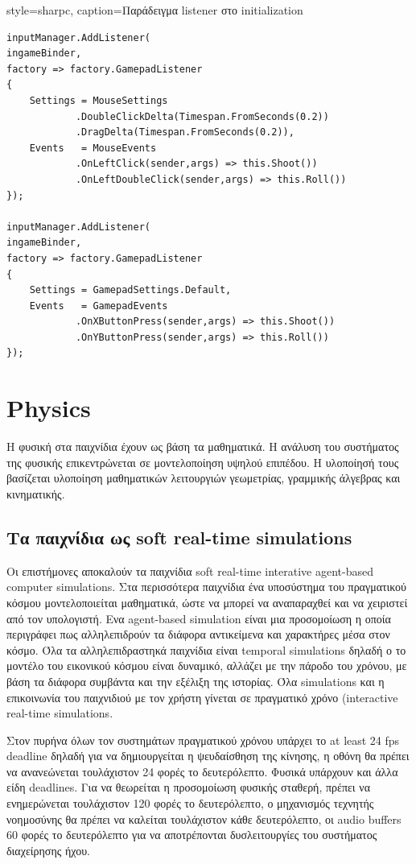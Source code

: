 	\lstset
	{
		style=sharpc, 
		caption={Παράδειγμα listener στο initialization}
	}
	\begin{lstlisting}
inputManager.AddListener(
ingameBinder,
factory => factory.GamepadListener
{
	Settings = MouseSettings
		    .DoubleClickDelta(Timespan.FromSeconds(0.2))
			.DragDelta(Timespan.FromSeconds(0.2)),
	Events   = MouseEvents
	        .OnLeftClick(sender,args) => this.Shoot())
	        .OnLeftDoubleClick(sender,args) => this.Roll())      	
});

inputManager.AddListener(
ingameBinder,
factory => factory.GamepadListener
{
	Settings = GamepadSettings.Default,
	Events   = GamepadEvents
			.OnXButtonPress(sender,args) => this.Shoot())
			.OnYButtonPress(sender,args) => this.Roll())      	
});
\end{lstlisting}

\section{Physics}
Η φυσική στα παιχνίδια έχουν ως βάση τα μαθηματικά. Η ανάλυση του συστήματος της φυσικής επικεντρώνεται σε μοντελοποίηση υψηλού επιπέδου. Η υλοποίησή τους βασίζεται υλοποίηση μαθηματικών λειτουργιών γεωμετρίας, γραμμικής άλγεβρας και κινηματικής.

\subsection{Τα παιχνίδια ως soft real-time simulations}
Οι επιστήμονες αποκαλούν τα παιχνίδια soft real-time interative agent-based computer simulations.
Στα περισσότερα παιχνίδια ένα υποσύστημα του πραγματικού κόσμου μοντελοποιείται μαθηματικά, ώστε να μπορεί να αναπαραχθεί και να χειριστεί από τον υπολογιστή. 
Ενα agent-based simulation είναι μια προσομοίωση η οποία περιγράφει πως αλληλεπιδρούν τα διάφορα αντικείμενα και χαρακτήρες μέσα στον κόσμο.
Όλα τα αλληλεπιδραστηκά παιχνίδια είναι temporal simulations δηλαδή ο το μοντέλο του εικονικού κόσμου είναι δυναμικό, αλλάζει με την πάροδο του χρόνου, με βάση τα διάφορα συμβάντα και την εξέλιξη της ιστορίας.
Όλα simulations και η επικοινωνία του παιχνιδιού με τον χρήστη γίνεται σε πραγματικό χρόνο (interactive real-time simulations. 

Στον πυρήνα όλων τον συστημάτων πραγματικού χρόνου υπάρχει το at least 24 fps deadline δηλαδή για να δημιουργείται η ψευδαίσθηση της κίνησης, η οθόνη θα πρέπει να ανανεώνεται τουλάχιστον 24 φορές το δευτερόλεπτο. Φυσικά υπάρχουν και άλλα είδη deadlines. Για να θεωρείται η προσομοίωση φυσικής σταθερή, πρέπει να ενημερώνεται τουλάχιστον 120 φορές το δευτερόλεπτο, ο μηχανισμός τεχνητής νοημοσύνης θα πρέπει να καλείται τουλάχιστον κάθε δευτερόλεπτο, οι audio buffers 60 φορές το δευτερόλεπτο για να αποτρέπονται δυσλειτουργίες του συστήματος διαχείρησης ήχου.

